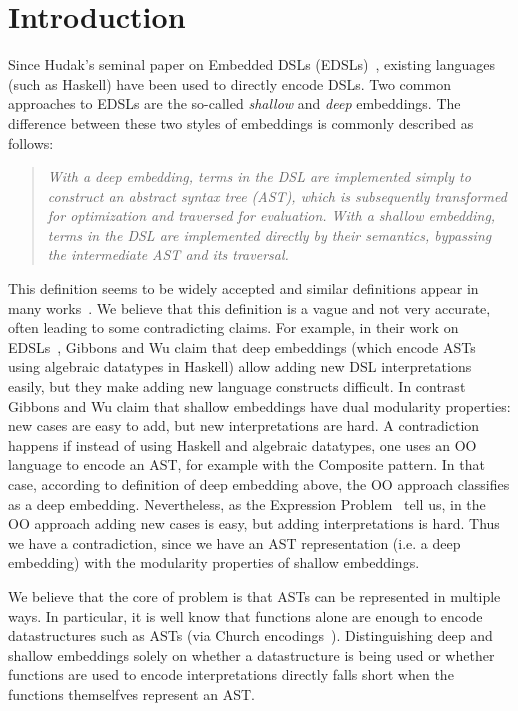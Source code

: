 \section{Introduction}

Since Hudak's seminal paper on Embedded DSLs (EDSLs)~\cite{}, existing
languages (such as Haskell) have been used to directly encode DSLs. Two common approaches to EDSLs are the
so-called \emph{shallow} and \emph{deep} embeddings. The difference 
between these two styles of embeddings is commonly described as 
follows:

\begin{quote}
\emph{With a deep embedding, terms in the DSL are implemented simply to
construct an abstract syntax tree (AST), which is subsequently
transformed for optimization and traversed for evaluation. With a
shallow embedding, terms in the DSL are implemented directly by
their semantics, bypassing the intermediate AST and its traversal.}\cite{gibbons15folding}
\end{quote}

This definition seems to be widely accepted and similar definitions
appear in many works~\cite{}. We believe that this definition is a
vague and not very accurate, often leading to some contradicting
claims. For example, in their work on EDSLs~\cite{}, Gibbons and Wu
claim that deep embeddings (which encode ASTs using algebraic
datatypes in Haskell) allow adding new DSL interpretations easily, but
they make adding new language constructs difficult. In contrast
Gibbons and Wu claim that shallow embeddings have dual modularity
properties: new cases are easy to add, but new interpretations are
hard.  A contradiction happens if instead of using Haskell and
algebraic datatypes, one uses an OO language to encode an AST, for
example with the {\sc Composite} pattern. In that case, according to
definition of deep embedding above, the OO approach classifies as a
deep embedding. Nevertheless, as the Expression Problem~\cite{} tell
us, in the OO approach adding new cases is easy, but adding
interpretations is hard. Thus we have a contradiction, since we have
an AST representation (i.e. a deep embedding) with the modularity
properties of shallow embeddings.

We believe that the core of problem is that ASTs can be represented 
in multiple ways. In particular, it is well know that functions alone 
are enough to encode datastructures such as ASTs (via Church
encodings~\cite{}). Distinguishing deep and shallow
embeddings solely on whether a datastructure is being used 
or whether functions are used to encode interpretations directly 
falls short when the functions themselfves represent an AST. 

